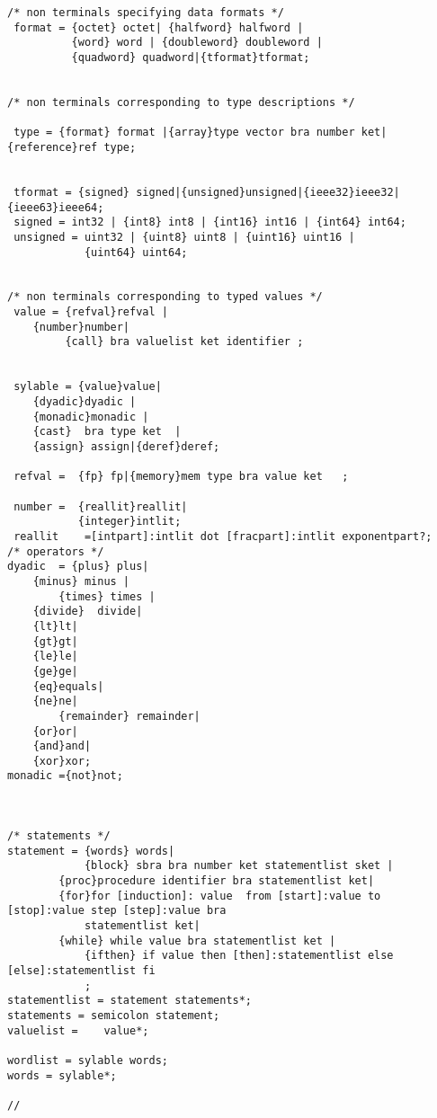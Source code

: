 \begin{verbatim}
/* non terminals specifying data formats */
 format = {octet} octet| {halfword} halfword |
          {word} word | {doubleword} doubleword |
          {quadword} quadword|{tformat}tformat;
 
 
/* non terminals corresponding to type descriptions */

 type = {format} format |{array}type vector bra number ket|{reference}ref type;
 

 tformat = {signed} signed|{unsigned}unsigned|{ieee32}ieee32|{ieee63}ieee64;
 signed = int32 | {int8} int8 | {int16} int16 | {int64} int64;
 unsigned = uint32 | {uint8} uint8 | {uint16} uint16 | 
            {uint64} uint64;
   

/* non terminals corresponding to typed values */
 value = {refval}refval |
	{number}number|
         {call} bra valuelist ket identifier ;

 
 sylable = {value}value|
	{dyadic}dyadic |
	{monadic}monadic | 
	{cast}  bra type ket  |
	{assign} assign|{deref}deref;
 
 refval =  {fp} fp|{memory}mem type bra value ket   ;
 
 number =  {reallit}reallit|
           {integer}intlit;
 reallit	=[intpart]:intlit dot [fracpart]:intlit exponentpart?;
/* operators */ 
dyadic  = {plus} plus| 
	{minus} minus | 
        {times} times | 
	{divide}  divide|
	{lt}lt|
	{gt}gt|
	{le}le|
	{ge}ge|
	{eq}equals|
	{ne}ne|
        {remainder} remainder|
	{or}or|
	{and}and|
	{xor}xor;
monadic ={not}not;



/* statements */
statement = {words} words|
            {block} sbra bra number ket statementlist sket |
	    {proc}procedure identifier bra statementlist ket|
	    {for}for [induction]: value  from [start]:value to [stop]:value step [step]:value bra
			statementlist ket| 
	    {while} while value bra statementlist ket |
            {ifthen} if value then [then]:statementlist else [else]:statementlist fi
            ;
statementlist = statement statements*;
statements = semicolon statement;
valuelist =    value*;
 
wordlist = sylable words;
words = sylable*;

// \end{verbatim}


